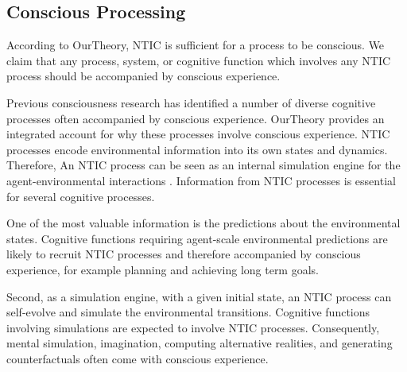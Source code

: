 \documentclass[utf8]{article}
\begin{document}
                
                



		\subsection{Conscious Processing}\label{sec:conscious processing}
		    According to \ac{OurTheory}, NTIC is sufficient for a process to be conscious. We claim that any process, system, or cognitive function which involves any NTIC process should be accompanied by conscious experience. 
		    
		    Previous consciousness research has identified a number of diverse cognitive processes often accompanied by conscious experience. \ac{OurTheory} provides an integrated account for why these processes involve conscious experience. NTIC processes encode environmental information into its own states and dynamics. Therefore, An NTIC process can be seen as an internal simulation engine for the agent-environmental interactions \citep{BERTSCHINGER.2006}. Information from NTIC processes is essential for several cognitive processes. 
		    
		    
		    One of the most valuable information is the predictions about the environmental states. Cognitive functions requiring agent-scale environmental predictions are likely to recruit NTIC processes and therefore accompanied by conscious experience, for example planning and achieving long term goals.
		   
            Second, as a simulation engine, with a given initial state, an NTIC process can self-evolve and simulate the environmental transitions. Cognitive functions involving simulations are expected to involve NTIC processes. Consequently, mental simulation, imagination, computing alternative realities, and generating counterfactuals often come with conscious experience. 
            
\end{document}
